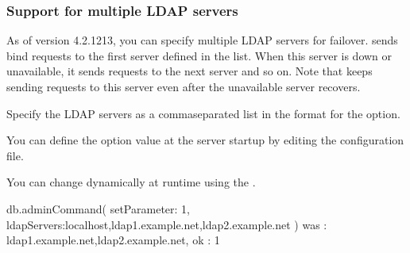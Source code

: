 \documentclass[letterpaper,10pt,english]{sphinxmanual}
\begin{document}
\subsubsection*{Support for multiple LDAP servers}

\sphinxAtStartPar
As of version 4.2.12\sphinxhyphen{}13, you can specify multiple LDAP servers for failover.  sends bind requests to the first server defined in the list. When this server is down or unavailable, it sends requests to the next server  and so on. Note that  keeps sending requests to this server even after the unavailable server recovers.

\sphinxAtStartPar
Specify the LDAP servers as a comma\sphinxhyphen{}separated list in the format  for the  option.

\sphinxAtStartPar
You can define the option value at the server startup by editing the configuration file.

\begin{sphinxVerbatim}[commandchars=\\\{\}]
\end{sphinxVerbatim}

\sphinxAtStartPar
You can change  dynamically at runtime using the {\hyperref[\detokenize{set-parameter:setparameter}]{}}.

\begin{sphinxVerbatim}[commandchars=\\\{\}]
\PYGZdl{} db.adminCommand( \PYGZob{} setParameter: 1, ldapServers:\PYGZdq{}localhost,ldap1.example.net,ldap2.example.net\PYGZdq{}\PYGZcb{} )
\PYGZob{} \PYGZdq{}was\PYGZdq{} : \PYGZdq{}ldap1.example.net,ldap2.example.net\PYGZdq{}, \PYGZdq{}ok\PYGZdq{} : 1 \PYGZcb{}
\end{sphinxVerbatim}


\nopagebreak
\end{document}
